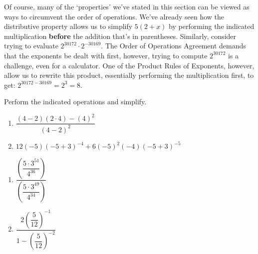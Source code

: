 \smallskip

Of course, many of the `properties' we've stated in this section can be viewed as ways to circumvent the order of operations. We've already seen how the distributive property allows us to simplify $5(2+x)$ by performing the indicated multiplication \textbf{before} the addition that's in parentheses.  Similarly, consider trying to evaluate $2^{30172}\cdot 2^{-30169}$.  The Order of Operations Agreement demands that the exponents be dealt with first, however, trying to compute $2^{30172}$ is a challenge, even for a calculator.  One of the Product Rules of Exponents, however, allow us to rewrite this product, essentially performing the multiplication first, to get:  $2^{30172-30169} = 2^{3} = 8$.  


\smallskip

\begin{ex} \label{exponentreview}  Perform the indicated operations and simplify.

\begin{multicols}{2}

\begin{enumerate}

\item  $\dfrac{(4-2)(2 \cdot 4)-(4)^2}{(4-2)^2}$

\item $12(-5)(-5+3)^{-4}+6(-5)^2(-4)(-5+3)^{-5}$

\setcounter{HW}{\value{enumi}}

\end{enumerate}

\end{multicols}

\begin{multicols}{2}

\begin{enumerate}

\setcounter{enumi}{\value{HW}}

\item  $\dfrac{\left(\dfrac{5\cdot 3^{51}}{4^{36}}\right)}{\left(\dfrac{5 \cdot 3^{49}}{4^{34}}\right)}$

\item $\dfrac{2 \left(\dfrac{5}{12}\right)^{-1}}{1 - \left(\dfrac{5}{12}\right)^{-2}}$

\end{enumerate}


\end{multicols}
\end{ex}
